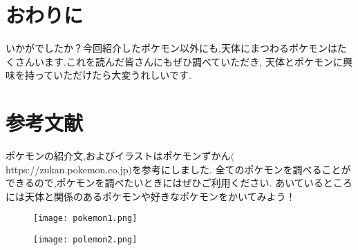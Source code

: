 \documentclass{article}
\begin{document}
\section{おわりに}
いかがでしたか？今回紹介したポケモン以外にも,天体にまつわるポケモンはたくさんいます.これを読んだ皆さんにもぜひ調べていただき,
天体とポケモンに興味を持っていただけたら大変うれしいです.
\section{参考文献}
ポケモンの紹介文,およびイラストはポケモンずかん$($https://zukan.pokemon.co.jp$)$を参考にしました.
全てのポケモンを調べることができるので,ポケモンを調べたいときにはぜひご利用ください.
\newpage
あいているところには天体と関係のあるポケモンや好きなポケモンをかいてみよう！
\vspace{2mm}
\begin{figure}[H]
	\texttt{[image: pokemon1.png]}
\end{figure}
\begin{figure}[H]
	\texttt{[image: polemon2.png]}
\end{figure}
\end{document}
